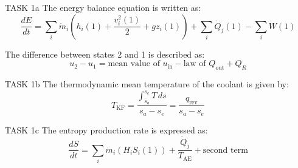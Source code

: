 TASK 1a  
The energy balance equation is written as:  
\[
\frac{dE}{dt} = \sum_i \dot{m}_i \left( h_i(1) + \frac{v_i^2(1)}{2} + g z_i(1) \right) + \sum_i \dot{Q}_j(1) - \sum_i \dot{W}(1)
\]  

The difference between states 2 and 1 is described as:  
\[
u_2 - u_1 = \text{mean value of } u_{\text{in}} - \text{law of } Q_{\text{out}} + Q_R
\]  

TASK 1b  
The thermodynamic mean temperature of the coolant is given by:  
\[
T_{\text{KF}} = \frac{\int_{s_a}^{s_e} T \, ds}{s_a - s_e} = \frac{q_{\text{rev}}}{s_a - s_e}
\]  

TASK 1c  
The entropy production rate is expressed as:  
\[
\frac{dS}{dt} = \sum_i \dot{m}_i \left( H_i S_i(1) \right) + \frac{\dot{Q}_j}{T_{\text{AE}}} + \text{second term}
\]